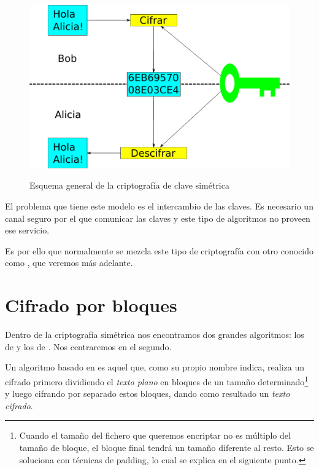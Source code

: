  \begin{figure}[ht]
   \centering
   \includegraphics[scale=0.5]{Figures/SymmetricKeyEncryption}
   \decoRule
   \caption[Criptografía de clave simétrica (Esquema)]{Esquema general de la criptografía de clave simétrica} \emph{\parencite{Reference20}}
   \label{fig:SymmetricKeyEncryption}
 \end{figure}

 El problema que tiene este modelo es el intercambio de las claves.
 Es necesario un canal seguro por el que comunicar las claves y este tipo de algoritmos no proveen ese servicio. \emph{\parencite{Reference19}}

 Es por ello que normalmente se mezcla este tipo de criptografía con otro conocido como , que veremos más adelante.


 \section{Cifrado por bloques}

 Dentro de la criptografía simétrica nos encontramos dos grandes algoritmos: los de  y los de .
 Nos centraremos en el segundo.

 Un algoritmo basado en  es aquel que, como su propio nombre indica,
 realiza un cifrado primero dividiendo el \emph{texto plano} en bloques de un tamaño determinado\footnote{Cuando el tamaño del fichero que queremos encriptar no es múltiplo del tamaño de bloque, el bloque final tendrá un tamaño diferente al resto. Esto se soluciona con técnicas de padding, lo cual se explica en el siguiente punto.}
 y luego cifrando por separado estos bloques, dando como resultado un \emph{texto cifrado}.

